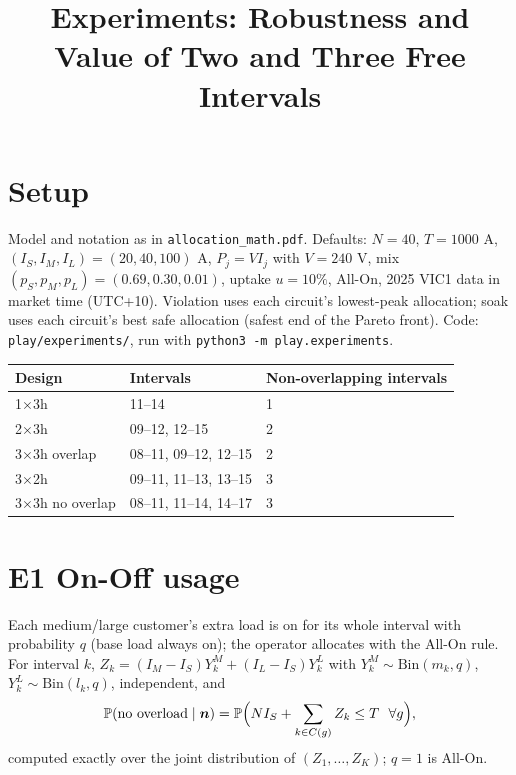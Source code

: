 \documentclass[10.5pt,a4paper]{article}
\title{Experiments: Robustness and Value of Two and Three Free Intervals}
\author{}
\date{}
\newcommand{\Prob}{\mathbb{P}}
\begin{document}
\maketitle

\section*{Setup}
Model and notation as in \texttt{allocation\_math.pdf}. Defaults: \(N=40\), \(T=1000\) A,
\((I_S,I_M,I_L)=(20,40,100)\) A, \(P_j=VI_j\) with \(V=240\) V, mix \((p_S,p_M,p_L)=(0.69,0.30,0.01)\),
uptake \(u=10\%\), All-On, 2025 VIC1 data in market time (UTC+10). Violation uses each circuit's
lowest-peak allocation; soak uses each circuit's best safe allocation (safest end of the Pareto
front). Code: \texttt{play/experiments/}, run with \texttt{python3 -m play.experiments}.

\begin{center}\small
\begin{tabular}{lll}
\toprule
Design & Intervals & Non-overlapping intervals\\
\midrule
1\(\times\)3h & 11--14 & 1\\
2\(\times\)3h & 09--12, 12--15 & 2\\
3\(\times\)3h overlap & 08--11, 09--12, 12--15 & 2\\
3\(\times\)2h & 09--11, 11--13, 13--15 & 3\\
3\(\times\)3h no overlap & 08--11, 11--14, 14--17 & 3\\
\bottomrule
\end{tabular}
\end{center}

\section{E1 On-Off usage}
Each medium/large customer's extra load is on for its whole interval with probability \(q\)
(base load always on); the operator allocates with the All-On rule. For interval \(k\),
\(Z_k=(I_M-I_S)Y^M_k+(I_L-I_S)Y^L_k\) with \(Y^M_k\sim\mathrm{Bin}(m_k,q)\),
\(Y^L_k\sim\mathrm{Bin}(l_k,q)\), independent, and
\begin{equation}
  \Prob(\text{no overload}\mid\boldsymbol n)=\Prob\Bigl(NI_S+\sum_{k\in C(g)}Z_k\le T\ \ \forall g\Bigr),
\end{equation}
computed exactly over the joint distribution of \((Z_1,\dots,Z_K)\); \(q=1\) is All-On.
\end{document}
